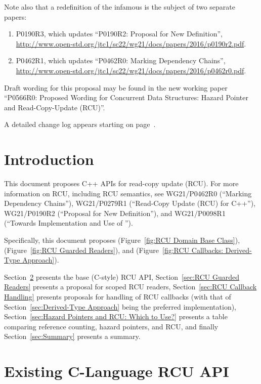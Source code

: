 \documentclass[letterpaper,10pt]{article}
\begin{document}
Note also that a redefinition of the infamous 
is the subject of two separate papers:

\begin{enumerate}
\item	P0190R3, which updates
	``P0190R2: Proposal for New  Definition'',
	\url{http://www.open-std.org/jtc1/sc22/wg21/docs/papers/2016/p0190r2.pdf}.
\item	P0462R1, which updates
	``P0462R0: Marking  Dependency Chains'',
	\url{http://www.open-std.org/jtc1/sc22/wg21/docs/papers/2016/p0462r0.pdf}.
\end{enumerate}

Draft wording for this proposal may be found in the new working paper
``P0566R0: Proposed Wording for Concurrent Data Structures: Hazard
Pointer and Read-Copy-Update (RCU)''.

A detailed change log appears starting on
page~\pageref{sec:Change Log}.

\section{Introduction}
\label{sec:Introduction}

This document proposes C++ APIs for read-copy update (RCU).
For more information on RCU, including RCU semantics, see
WG21/P0462R0 (``Marking  Dependency Chains''),
WG21/P0279R1 (``Read-Copy Update (RCU) for C++''),
WG21/P0190R2 (``Proposal for New  Definition''),
and
WG21/P0098R1 (``Towards Implementation and Use of '').

Specifically, this document proposes
 (Figure~\ref{fig:RCU Domain Base Class}),
 (Figure~\ref{fig:RCU Guarded Readers}), and
 (Figure~\ref{fig:RCU Callbacks: Derived-Type Approach}).

Section~\ref{sec:Existing C-Language RCU API} presents the base (C-style) RCU API,
Section~\ref{sec:RCU Guarded Readers} presents a proposal for scoped RCU readers,
Section~\ref{sec:RCU Callback Handling} presents proposals for handling of
RCU callbacks (with that of
Section~\ref{sec:Derived-Type Approach} being the preferred implementation),
Section~\ref{sec:Hazard Pointers and RCU: Which to Use?} presents a
table comparing reference counting, hazard pointers, and RCU, and finally
Section~\ref{sec:Summary} presents a summary.

\section{Existing C-Language RCU API}
\label{sec:Existing C-Language RCU API}
\end{document}
